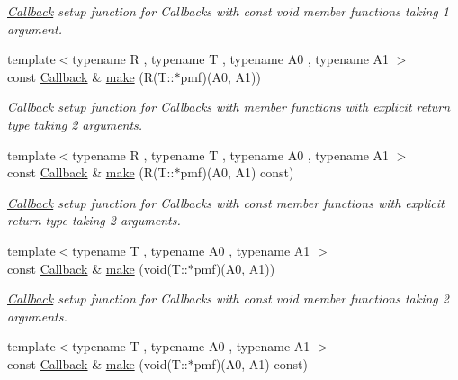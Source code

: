 \begin{DoxyCompactItemize}
\begin{DoxyCompactList}\small\item\em \hyperlink{class_d_d4hep_1_1_callback}{Callback} setup function for Callbacks with const void member functions taking 1 argument. \item\end{DoxyCompactList}\item 
{\footnotesize template$<$typename R , typename T , typename A0 , typename A1 $>$ }\\const \hyperlink{class_d_d4hep_1_1_callback}{Callback} \& \hyperlink{class_d_d4hep_1_1_callback_ab9493ba45378fdb3ed3d9a906b7e3d73}{make} (R(T::$\ast$pmf)(A0, A1))
\begin{DoxyCompactList}\small\item\em \hyperlink{class_d_d4hep_1_1_callback}{Callback} setup function for Callbacks with member functions with explicit return type taking 2 arguments. \item\end{DoxyCompactList}\item 
{\footnotesize template$<$typename R , typename T , typename A0 , typename A1 $>$ }\\const \hyperlink{class_d_d4hep_1_1_callback}{Callback} \& \hyperlink{class_d_d4hep_1_1_callback_abc72652496b83fa106b141b86fffca6c}{make} (R(T::$\ast$pmf)(A0, A1) const)
\begin{DoxyCompactList}\small\item\em \hyperlink{class_d_d4hep_1_1_callback}{Callback} setup function for Callbacks with const member functions with explicit return type taking 2 arguments. \item\end{DoxyCompactList}\item 
{\footnotesize template$<$typename T , typename A0 , typename A1 $>$ }\\const \hyperlink{class_d_d4hep_1_1_callback}{Callback} \& \hyperlink{class_d_d4hep_1_1_callback_aa18a59952eb491c6fcfd8f8fc2c9bf04}{make} (void(T::$\ast$pmf)(A0, A1))
\begin{DoxyCompactList}\small\item\em \hyperlink{class_d_d4hep_1_1_callback}{Callback} setup function for Callbacks with const void member functions taking 2 arguments. \item\end{DoxyCompactList}\item 
{\footnotesize template$<$typename T , typename A0 , typename A1 $>$ }\\const \hyperlink{class_d_d4hep_1_1_callback}{Callback} \& \hyperlink{class_d_d4hep_1_1_callback_a65524e85eac0683d3339c6548ff35449}{make} (void(T::$\ast$pmf)(A0, A1) const)

\end{DoxyCompactItemize}
